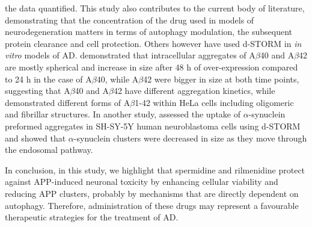 the data quantified. This study also contributes to the current body of literature, demonstrating that the concentration of the drug used in models of neurodegeneration matters in terms of autophagy modulation, the subsequent protein clearance and cell protection. Others however have used d-STORM in \textit{in vitro} models of AD. \citet{Esbjorner2014} demonstrated that intracellular aggregates of A$\beta$40 and A$\beta$42 are mostly spherical and increase in size after 48 h of over-expression compared to 24 h in the case of A$\beta$40, while A$\beta$42 were bigger in size at both time points, suggesting that A$\beta$40 and A$\beta$42 have different aggregation kinetics, while \citet{KaminskiSchierle2011} demonstrated different forms of A$\beta$1-42 within HeLa cells including oligomeric and fibrillar structures. In another study, \citet{Apetri2016} assessed the uptake of $\alpha$-synuclein preformed aggregates in SH-SY-5Y human neuroblastoma cells using d-STORM and showed that $\alpha$-synuclein clusters were decreased in size as they move through the endosomal pathway. 

In conclusion, in this study, we highlight that spermidine and rilmenidine protect against APP-induced neuronal toxicity by enhancing cellular viability and reducing APP clusters, probably by mechanisms that are directly dependent on autophagy. Therefore, administration of these drugs may represent a favourable therapeutic strategies for the treatment of AD. 